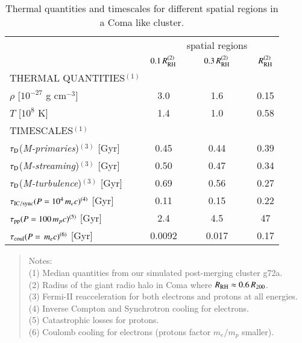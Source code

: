 \documentclass[useAMS,usenatbib]{mn2e}
\newcommand{\Mstream}{{\it M-streaming}\xspace}
\newcommand{\Mflatturb}{{\it M-turbulence}\xspace}
\newcommand{\Mprimary}{{\it M-primaries}\xspace}
\newcommand{\RH}{R_\rmn{RH}}
\begin{document}
\begin{table}
  \caption{Thermal quantities and timescales for different spatial
    regions in a Coma like cluster.}
\begin{tabular}{l c  c c}
\hline
\hline
& & spatial regions & \\
 & $0.1\,\RH^{(2)}$ & $0.3\,\RH^{(2)}$ & $\RH^{(2)}$   \\
\hline
THERMAL QUANTITIES$^{(1)}$ & & & \\
$\rho$ [$10^{-27}$ g cm$^{-3}$] & 3.0 & 1.6 & 0.15 \\
$T$ [$10^{8}$ K] & 1.4 & 1.0 & 0.58 \\
\hline
TIMESCALES$^{(1)}$ & & & \\
$\tau_{\mathrm{D}}$(\Mprimary)$^{(3)}$ [Gyr] & 0.45 & 0.44 & 0.39 \\
$\tau_{\mathrm{D}}$(\Mstream)$^{(3)}$  [Gyr] & 0.50 & 0.47 & 0.34 \\
$\tau_{\mathrm{D}}$(\Mflatturb)$^{(3)}$  [Gyr] & 0.69 & 0.56 & 0.27 \\
$\tau_{\mathrm{IC/sync}}(P=10^4\,m_ec)^{(4)}$ [Gyr] & 0.11 & 0.15 & 0.22 \\
$\tau_{\mathrm{pp}}(P=100\,m_pc)^{(5)}$ [Gyr] & 2.4 & 4.5 & 47 \\
$\tau_{\mathrm{coul}}(P=\,m_ec)^{(6)}$  [Gyr] & 0.0092 & 0.017 & 0.17 \\
\hline
\end{tabular}
\begin{quote}
 Notes: \\ 
 (1) Median quantities from our simulated post-merging cluster g72a.\\
 (2) Radius of the giant radio halo in Coma where $\RH\approx0.6\,R_{200}$.\\
 (3) Fermi-II reacceleration for both electrons and protons at all energies.\\
 (4) Inverse Compton and Synchrotron cooling for electrons.\\
 (5) Catastrophic losses for protons.\\
 (6) Coulomb cooling for electrons (protons factor $m_e/m_p$ smaller).\\

 \label{tab:timescales}
  \end{quote}
\end{table} 


\end{document}
